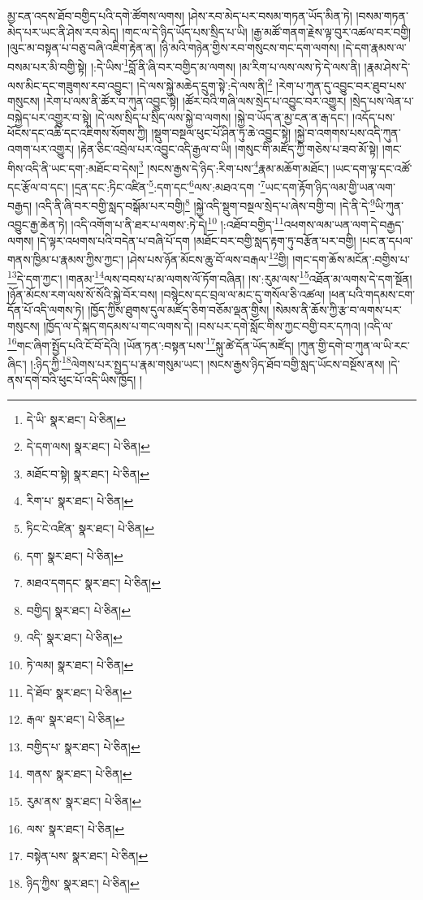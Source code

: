 མྱ་ངན་འདས་ཐོབ་བགྱིད་པའི་དགེ་ཚོགས་ལགས། །ཤེས་རབ་མེད་པར་བསམ་གཏན་ཡོད་མིན་ཏེ། །བསམ་གཏན་མེད་པར་ཡང་ནི་ཤེས་རབ་མེད། །གང་ལ་དེ་ཉིད་ཡོད་པས་སྲིད་པ་ཡི། །རྒྱ་མཚོ་གནག་རྗེས་ལྟ་བུར་འཚལ་བར་བགྱི། །ལུང་མ་བསྟན་པ་བཅུ་བཞི་འཇིག་རྟེན་ན། །ཉི་མའི་གཉེན་གྱིས་རབ་གསུངས་གང་དག་ལགས། །དེ་དག་རྣམས་ལ་བསམ་པར་མི་བགྱི་སྟེ། །:དེ་ཡིས་\footnote{དེ་ཡི་  སྣར་ཐང་།  པེ་ཅིན། }བློ་ནི་ཞི་བར་བགྱིད་མ་ལགས། །མ་རིག་པ་ལས་ལས་ཏེ་དེ་ལས་ནི། །རྣམ་ཤེས་དེ་ལས་མིང་དང་གཟུགས་རབ་འབྱུང་། །དེ་ལས་སྐྱེ་མཆེད་དྲུག་སྟེ་:དེ་ལས་ནི།\footnote{དེ་དག་ལས།  སྣར་ཐང་།  པེ་ཅིན། } །རེག་པ་ཀུན་དུ་འབྱུང་བར་ཐུབ་པས་གསུངས། །རེག་པ་ལས་ནི་ཚོར་བ་ཀུན་འབྱུང་སྟེ། །ཚོར་བའི་གཞི་ལས་སྲེད་པ་འབྱུང་བར་འགྱུར། །སྲེད་པས་ལེན་པ་བསྐྱེད་པར་འགྱུར་བ་སྟེ། །དེ་ལས་སྲིད་པ་སྲིད་ལས་སྐྱེ་བ་ལགས། །སྐྱེ་བ་ཡོད་ན་མྱ་ངན་ན་རྒ་དང་། །འདོད་པས་ཕོངས་དང་འཆི་དང་འཇིགས་སོགས་ཀྱི། །སྡུག་བསྔལ་ཕུང་པོ་ཤིན་ཏུ་ཆེ་འབྱུང་སྟེ། །སྐྱེ་བ་འགགས་པས་འདི་ཀུན་འགག་པར་འགྱུར། །རྟེན་ཅིང་འབྲེལ་པར་འབྱུང་འདི་རྒྱལ་བ་ཡི། །གསུང་གི་མཛོད་ཀྱི་གཅེས་པ་ཟབ་མོ་སྟེ། །གང་གིས་འདི་ནི་ཡང་དག་:མཐོང་བ་དེས།\footnote{མཐོང་བ་སྟེ།  སྣར་ཐང་།  པེ་ཅིན། } །སངས་རྒྱས་དེ་ཉིད་:རིག་པས་\footnote{རིག་པ་  སྣར་ཐང་།  པེ་ཅིན། }རྣམ་མཆོག་མཐོང་། །ཡང་དག་ལྟ་དང་འཚོ་དང་རྩོལ་བ་དང་། །དྲན་དང་:ཏིང་འཛིན་\footnote{ཏིང་ངེ་འཛིན་  སྣར་ཐང་།  པེ་ཅིན། }:དག་དང་\footnote{དག་  སྣར་ཐང་།  པེ་ཅིན། }ལས་:མཐའ་དག ་\footnote{མཐའ་དགདང་  སྣར་ཐང་།  པེ་ཅིན། }ཡང་དག་རྟོག་ཉིད་ལམ་གྱི་ཡན་ལག་བརྒྱད། །འདི་ནི་ཞི་བར་བགྱི་སླད་བསྒོམ་པར་བགྱི།\footnote{བགྱིད།  སྣར་ཐང་།  པེ་ཅིན། } །སྐྱེ་འདི་སྡུག་བསྔལ་སྲེད་པ་ཞེས་བགྱི་བ། །དེ་ནི་དེ་\footnote{འདི་  སྣར་ཐང་།  པེ་ཅིན། }ཡི་ཀུན་འབྱུང་རྒྱ་ཆེན་ཏེ། །འདི་འགོག་པ་ནི་ཐར་པ་ལགས་:ཏེ་དེ།\footnote{ཏེ་ལམ།  སྣར་ཐང་།  པེ་ཅིན། } །:འཐོབ་བགྱིད་\footnote{དེ་ཐོབ་  སྣར་ཐང་།  པེ་ཅིན། }འཕགས་ལམ་ཡན་ལག་དེ་བརྒྱད་ལགས། །དེ་ལྟར་འཕགས་པའི་བདེན་པ་བཞི་པོ་དག །མཐོང་བར་བགྱི་སླད་རྟག་ཏུ་བརྩོན་པར་བགྱི། །པང་ན་དཔལ་གནས་ཁྱིམ་པ་རྣམས་ཀྱིས་ཀྱང་། །ཤེས་པས་ཉོན་མོངས་ཆུ་བོ་ལས་བརྒལ་\footnote{རྒལ་  སྣར་ཐང་།  པེ་ཅིན། }གྱི། །གང་དག་ཆོས་མངོན་:བགྱིས་པ་\footnote{བགྱིད་པ་  སྣར་ཐང་།  པེ་ཅིན། }དེ་དག་ཀྱང་། །གནམ་\footnote{གནས་  སྣར་ཐང་།  པེ་ཅིན། }ལས་བབས་པ་མ་ལགས་ལོ་ཏོག་བཞིན། །ས་:རུམ་ལས་\footnote{རུམ་ནས་  སྣར་ཐང་།  པེ་ཅིན། }འཐོན་མ་ལགས་དེ་དག་སྔོན། །ཉོན་མོངས་རག་ལས་སོ་སོའི་སྐྱེ་བོར་བས། །བསྙེངས་དང་བྲལ་ལ་མང་དུ་གསོལ་ཅི་འཚལ། །ཕན་པའི་གདམས་ངག་དོན་པོ་འདི་ལགས་ཏེ། །ཁྱོད་ཀྱིས་ཐུགས་དུལ་མཛོད་ཅིག་བཅོམ་ལྡན་གྱིས། །སེམས་ནི་ཆོས་ཀྱི་རྩ་བ་ལགས་པར་གསུངས། །ཁྱོད་ལ་དེ་སྐད་གདམས་པ་གང་ལགས་དེ། །བས་པར་དགེ་སློང་གིས་ཀྱང་བགྱི་བར་དཀའ། །འདི་ལ་\footnote{ལས་  སྣར་ཐང་།  པེ་ཅིན། }གང་ཞིག་སྤྱོད་པའི་ངོ་བོ་དེའི། །ཡོན་ཏན་:བསྟན་པས་\footnote{བསྟེན་པས་  སྣར་ཐང་།  པེ་ཅིན། }སྐུ་ཚེ་དོན་ཡོད་མཛོད། །ཀུན་གྱི་དགེ་བ་ཀུན་ལ་ཡི་རང་ཞིང་། །:ཉིད་ཀྱི་\footnote{ཉིད་ཀྱིས་  སྣར་ཐང་།  པེ་ཅིན། }ལེགས་པར་སྤྱད་པ་རྣམ་གསུམ་ཡང་། །སངས་རྒྱས་ཉིད་ཐོབ་བགྱི་སླད་ཡོངས་བསྔོས་ནས། །དེ་ནས་དགེ་བའི་ཕུང་པོ་འདི་ཡིས་ཁྱོད། །
